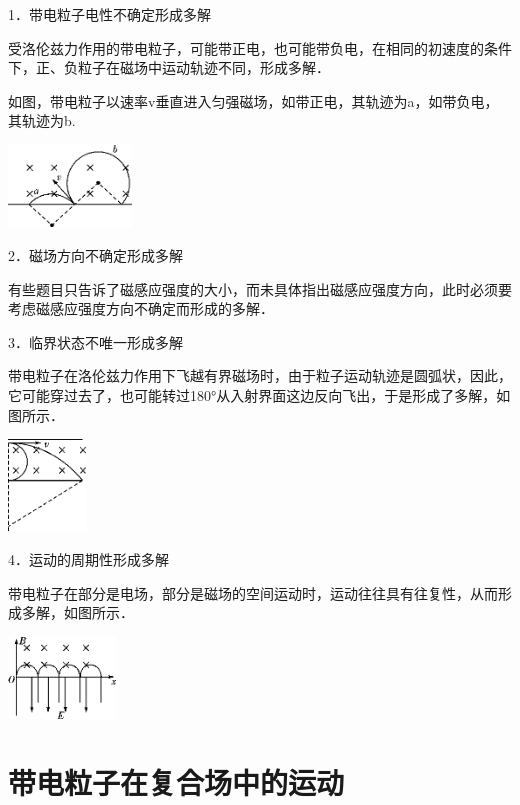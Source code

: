 1．带电粒子电性不确定形成多解

受洛伦兹力作用的带电粒子，可能带正电，也可能带负电，在相同的初速度的条件下，正、负粒子在磁场中运动轨迹不同，形成多解．

如图，带电粒子以速率v垂直进入匀强磁场，如带正电，其轨迹为a，如带负电，其轨迹为b.

\begin{center}\includegraphics[width=1.29236in,height=0.85833in]{media/image358.png}\end{center}


2．磁场方向不确定形成多解

有些题目只告诉了磁感应强度的大小，而未具体指出磁感应强度方向，此时必须要考虑磁感应强度方向不确定而形成的多解．


3．临界状态不唯一形成多解

带电粒子在洛伦兹力作用下飞越有界磁场时，由于粒子运动轨迹是圆弧状，因此，它可能穿过去了，也可能转过180°从入射界面这边反向飞出，于是形成了多解，如图所示．

\begin{center}\includegraphics[width=0.81111in,height=0.9625in]{media/image360.png}\end{center}


4．运动的周期性形成多解

带电粒子在部分是电场，部分是磁场的空间运动时，运动往往具有往复性，从而形成多解，如图所示．

\begin{center}\includegraphics[width=1.12292in,height=0.85833in]{media/image362.png}\end{center}
\newpage
\section{带电粒子在复合场中的运动}

